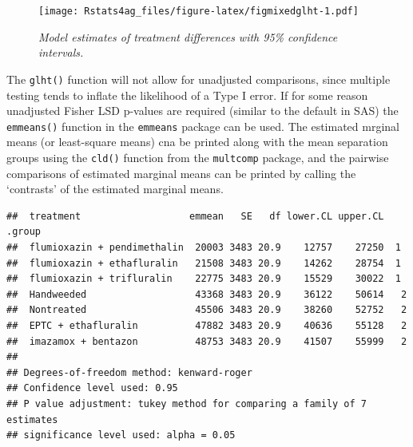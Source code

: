 \documentclass[letterpaper,]{book}
\newenvironment{Shaded}{\begin{snugshade}}{\end{snugshade}}
\newcommand{\DataTypeTok}[1]{\textcolor[rgb]{0.13,0.29,0.53}{#1}}
\newcommand{\KeywordTok}[1]{\textcolor[rgb]{0.13,0.29,0.53}{\textbf{#1}}}
\newcommand{\NormalTok}[1]{#1}
\newcommand{\OperatorTok}[1]{\textcolor[rgb]{0.81,0.36,0.00}{\textbf{#1}}}
\newcommand{\StringTok}[1]{\textcolor[rgb]{0.31,0.60,0.02}{#1}}
\begin{document}
\begin{figure}
\centering
\texttt{[image: Rstats4ag\_files/figure-latex/figmixedglht-1.pdf]}
\caption{\label{fig:figmixedglht}\emph{Model estimates of treatment differences with 95\% confidence intervals.}}
\end{figure}

The \texttt{glht()} function will not allow for unadjusted comparisons, since multiple testing tends to inflate the likelihood of a Type I error. If for some reason unadjusted Fisher LSD p-values are required (similar to the default in SAS) the \texttt{emmeans()} function in the \texttt{emmeans} package can be used. The estimated mrginal means (or least-square means) cna be printed along with the mean separation groups using the \texttt{cld()} function from the \texttt{multcomp} package, and the pairwise comparisons of estimated marginal means can be printed by calling the `contrasts' of the estimated marginal means.

\begin{Shaded}
\end{Shaded}

\begin{verbatim}
##  treatment                   emmean   SE   df lower.CL upper.CL .group
##  flumioxazin + pendimethalin  20003 3483 20.9    12757    27250  1    
##  flumioxazin + ethafluralin   21508 3483 20.9    14262    28754  1    
##  flumioxazin + trifluralin    22775 3483 20.9    15529    30022  1    
##  Handweeded                   43368 3483 20.9    36122    50614   2   
##  Nontreated                   45506 3483 20.9    38260    52752   2   
##  EPTC + ethafluralin          47882 3483 20.9    40636    55128   2   
##  imazamox + bentazon          48753 3483 20.9    41507    55999   2   
## 
## Degrees-of-freedom method: kenward-roger 
## Confidence level used: 0.95 
## P value adjustment: tukey method for comparing a family of 7 estimates 
## significance level used: alpha = 0.05
\end{verbatim}
\end{document}
